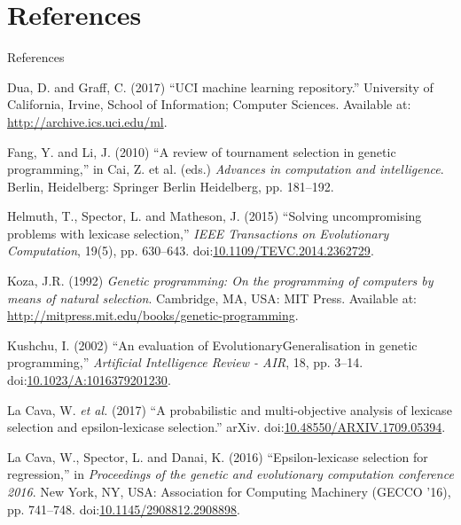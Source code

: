 \documentclass[
  ignorenonframetext,
]{beamer}
\newlength{\cslhangindent}
\newlength{\cslentryspacingunit} %
\newenvironment{CSLReferences}[2] %
 {%
  \setlength{\parindent}{0pt}
  \ifodd #1
  \let\oldpar\par
  \def\par{\hangindent=\cslhangindent\oldpar}
  \fi
  \setlength{\parskip}{#2\cslentryspacingunit}
 }%
 {}
\begin{document}
\hypertarget{references}{%
\section*{References}\label{references}}

\begin{frame}[allowframebreaks]{References}
\hypertarget{refs}{}
\begin{CSLReferences}{0}{0}
\leavevmode{}%
Dua, D. and Graff, C. (2017) {``{UCI} machine learning repository.''}
University of California, Irvine, School of Information; Computer
Sciences. Available at: \url{http://archive.ics.uci.edu/ml}.

\leavevmode{}%
Fang, Y. and Li, J. (2010) {``A review of tournament selection in
genetic programming,''} in Cai, Z. et al. (eds.) \emph{Advances in
computation and intelligence}. Berlin, Heidelberg: Springer Berlin
Heidelberg, pp. 181--192.

\leavevmode{}%
Helmuth, T., Spector, L. and Matheson, J. (2015) {``Solving
uncompromising problems with lexicase selection,''} \emph{IEEE
Transactions on Evolutionary Computation}, 19(5), pp. 630--643.
doi:\href{https://doi.org/10.1109/TEVC.2014.2362729}{10.1109/TEVC.2014.2362729}.

\leavevmode{}%
Koza, J.R. (1992) \emph{Genetic programming: On the programming of
computers by means of natural selection}. Cambridge, MA, USA: MIT Press.
Available at: \url{http://mitpress.mit.edu/books/genetic-programming}.

\leavevmode{}%
Kushchu, I. (2002) {``An evaluation of EvolutionaryGeneralisation in
genetic programming,''} \emph{Artificial Intelligence Review - AIR}, 18,
pp. 3--14.
doi:\href{https://doi.org/10.1023/A:1016379201230}{10.1023/A:1016379201230}.

\leavevmode{}%
La Cava, W. \emph{et al.} (2017) {``A probabilistic and multi-objective
analysis of lexicase selection and epsilon-lexicase selection.''} arXiv.
doi:\href{https://doi.org/10.48550/ARXIV.1709.05394}{10.48550/ARXIV.1709.05394}.

\leavevmode{}%
La Cava, W., Spector, L. and Danai, K. (2016) {``Epsilon-lexicase
selection for regression,''} in \emph{Proceedings of the genetic and
evolutionary computation conference 2016}. New York, NY, USA:
Association for Computing Machinery (GECCO '16), pp. 741--748.
doi:\href{https://doi.org/10.1145/2908812.2908898}{10.1145/2908812.2908898}.


\end{CSLReferences}
\end{frame}
\end{document}
